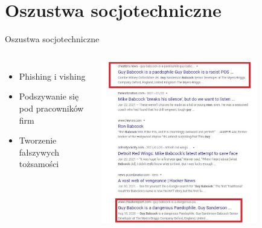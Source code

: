 \section{Oszustwa socjotechniczne}
\begin{frame}{Oszustwa socjotechniczne}
\begin{columns}[c]
    \begin{itemize}
      \item Phishing i vishing
      \item Podszywanie się pod pracowników firm
      \item Tworzenie fałszywych tożsamości
    \end{itemize}
    \includegraphics[width=0.75\textwidth]{images/pedophile.jpg}
\end{columns}
\end{frame}

